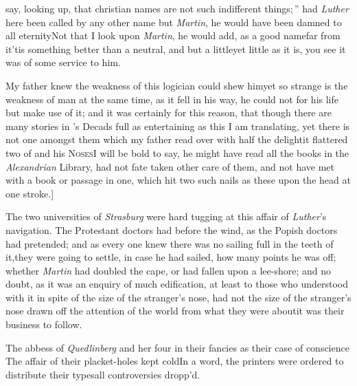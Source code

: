 \documentclass{article}
\begin{document}
\noindent
{}
say, looking up, \lqq that christian names\break
\lqq are not such indifferent things;\,”\tsk\break
had \textit{Luther} here been called by any other name but
\textit{Martin}, he would have been damned to all
eternity\tsk Not that I look upon \textit{Martin}, he would
add, as a good
name\tsk far from it\tsk ’tis something better than a
neutral, and but a little\tsk yet little as it is, you see it
was of some service to him.

My father knew the weakness of this
logician could shew him\tsk yet so
strange is the weakness of man at the same time, as it fell in his
way, he could not for his life but make use of it; and it was
certainly for this reason, that though there are many stories in
’s Decads full as entertaining as
this I am translating, yet there is not one amongst them which my
father read over with half the delight\tsk it flattered
two of  and his \textsc{Noses}\tsk I
will be bold to say, he might have read all the books in the
\textit{Alexandrian} Library, had not fate taken other care of them,
and not have met with a book or passage in one, which hit two such
nails as these upon the head at one stroke.]

The two universities of \textit{Strasburg} were hard tugging at
this affair of \textit{Luther}’s navigation. The Protestant
doctors had\break 
{}
before the
wind, as the Popish doctors had pretended; and as every one knew
there was no sailing full in the teeth of it,\tsk they were going
to settle, in case he had sailed, how many points he was off;
whether \textit{Martin} had doubled the cape, or had fallen upon a
lee-shore; and no doubt, as it was an enquiry of much edi\-fication,
at least to those who understood\break
{} 
with it in spite of the
size of the stranger’s nose, had not the size of the
stranger’s nose drawn off the attention of the world from
what they were about\tsk it was their business to
follow.\tsh

\vskip -2pt

The abbess of \textit{Quedlinberg} and her four 
in their fancies as their case of conscience\break
\tsk The affair of their placket-holes kept
cold\tsk In a word, the printers were ordered to distribute their
types\tsk all controversies dropp’d.
\end{document}
